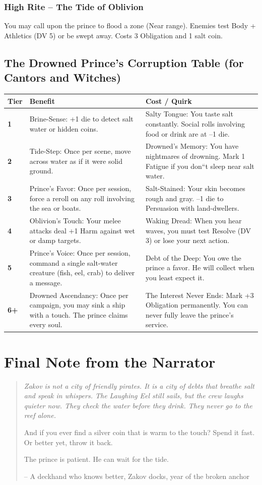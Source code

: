 \documentclass[12pt]{article}
\newenvironment{quoteBox}
  {\begin{quote}\itshape}
  {\end{quote}}
\begin{document}
\subsubsection{High Rite -- The Tide of Oblivion}
You may call upon the prince to flood a zone (Near range). Enemies test Body + Athletics (DV 5) or be swept away. Costs 3 Obligation and 1 salt coin.

\subsection{The Drowned Prince's Corruption Table (for Cantors and Witches)}
\begin{center}
\begin{tabular}{>{\bfseries}l l l}
\toprule
Tier & Benefit & Cost / Quirk \\
\midrule
1 & Brine-Sense: +1 die to detect salt water or hidden coins. & Salty Tongue: You taste salt constantly. Social rolls involving food or drink are at --1 die. \\
2 & Tide-Step: Once per scene, move across water as if it were solid ground. & Drowned's Memory: You have nightmares of drowning. Mark 1 Fatigue if you don``t sleep near salt water. \\
3 & Prince's Favor: Once per session, force a reroll on any roll involving the sea or boats. & Salt-Stained: Your skin becomes rough and gray. --1 die to Persuasion with land-dwellers. \\
4 & Oblivion's Touch: Your melee attacks deal +1 Harm against wet or damp targets. & Waking Dread: When you hear waves, you must test Resolve (DV 3) or lose your next action. \\
5 & Prince's Voice: Once per session, command a single salt-water creature (fish, eel, crab) to deliver a message. & Debt of the Deep: You owe the prince a favor. He will collect when you least expect it. \\
6+ & Drowned Ascendancy: Once per campaign, you may sink a ship with a touch. The prince claims every soul. & The Interest Never Ends: Mark +3 Obligation permanently. You can never fully leave the prince's service. \\
\bottomrule
\end{tabular}
\end{center}

\section*{Final Note from the Narrator}
\begin{quoteBox}
Zakov is not a city of friendly pirates. It is a city of debts that breathe salt and speak in whispers. The \textit{Laughing Eel} still sails, but the crew laughs quieter now. They check the water before they drink. They never go to the reef alone.

And if you ever find a silver coin that is warm to the touch? Spend it fast. Or better yet, throw it back.

The prince is patient. He can wait for the tide.

-- A deckhand who knows better, Zakov docks, year of the broken anchor
\end{quoteBox}


\end{document}
